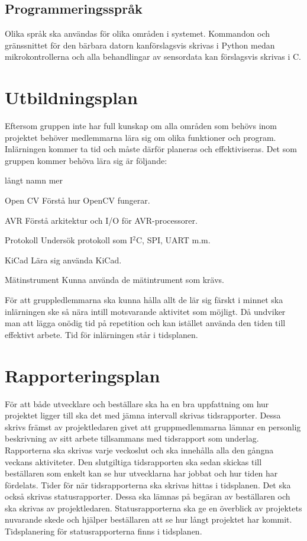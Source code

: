 \documentclass[projektplan/plan.tex]{subfiles}
\begin{document}
\subsection{Programmeringsspråk}
Olika språk ska användas för olika områden i systemet. Kommandon och gränssnittet för den bärbara datorn kanförslagsvis skrivas i Python medan mikrokontrollerna och alla behandlingar av sensordata kan förslagsvis skrivas i C.

\newpage
\section{Utbildningsplan}
Eftersom gruppen inte har full kunskap om alla områden som behövs inom projektet behöver medlemmarna lära sig om olika funktioner och program. Inlärningen kommer ta tid och måste därför planeras och effektiviseras. Det som gruppen kommer behöva lära sig är följande:

\begin{labeling}{långt namn mer}
    \item[Open CV] Förstå hur OpenCV fungerar.
    \item[AVR] Förstå arkitektur och I/O för
    AVR-processorer.
    \item[Protokoll] Undersök protokoll som
    I$^2$C, SPI, UART m.m.
    \item[KiCad] Lära sig använda KiCad.
    \item[Mätinstrument] Kunna använda de mätintrument som krävs.
\end{labeling}

För att gruppledlemmarna ska kunna hålla allt de lär sig färskt i minnet ska inlärningen ske så nära intill motsvarande aktivitet som möjligt. Då undviker man att lägga onödig tid på repetition och kan istället använda den tiden till effektivt arbete. Tid för inlärningen står i tidsplanen.

\section{Rapporteringsplan}
För att både utvecklare och beställare ska ha en bra uppfattning om hur projektet ligger till ska det med jämna intervall skrivas tidsrapporter. Dessa skrivs främst av projektledaren givet att gruppmedlemmarna lämnar en personlig beskrivning av sitt arbete tillsammans med tidsrapport som underlag. Rapporterna ska skrivas varje veckoslut och ska innehålla alla den gångna veckans aktiviteter. Den slutgiltiga tidsrapporten ska sedan skickas till beställaren som enkelt kan se hur utvecklarna har jobbat och hur tiden har fördelats. Tider för när tidsrapporterna ska skrivas hittas i tidsplanen.
Det ska också skrivas statusrapporter. Dessa ska lämnas på begäran av beställaren och ska skrivas av projektledaren. Statusrapporterna ska ge en överblick av projektets nuvarande skede och hjälper beställaren att se hur långt projektet har kommit. Tidsplanering för statusrapporterna finns i tidsplanen.
\end{document}
